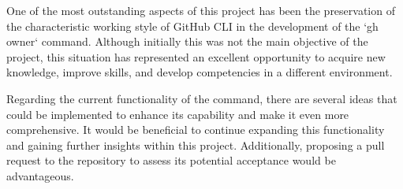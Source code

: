 One of the most outstanding aspects of this project has been the preservation of the characteristic working style of GitHub CLI in the development of the `gh owner` command. Although initially this was not the main objective of the project, this situation has represented an excellent opportunity to acquire new knowledge, improve skills, and develop competencies in a different environment.

Regarding the current functionality of the command, there are several ideas that could be implemented to enhance its capability and make it even more comprehensive. It would be beneficial to continue expanding this functionality and gaining further insights within this project. Additionally, proposing a pull request to the repository to assess its potential acceptance would be advantageous.